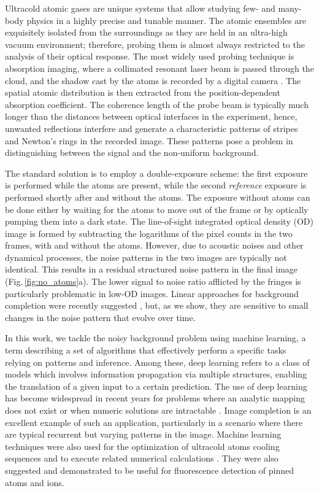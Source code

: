 \documentclass[twocolumn,groupedaddress,longbibliography]{revtex4-1}
\begin{document}
Ultracold atomic gases are unique systems that allow studying few- and many-body physics in a highly precise and tunable manner. The atomic ensembles are exquisitely isolated from the surroundings as they are held in an ultra-high vacuum environment; therefore, probing them is almost always restricted to the analysis of their optical response. The most widely used probing technique is absorption imaging, where a collimated resonant laser beam is passed through the cloud, and the shadow cast by the atoms is recorded by a digital camera \cite{MakingProbing}. The spatial atomic distribution is then extracted from the position-dependent absorption coefficient. The coherence length of the probe beam is typically much longer than the distances between optical interfaces in the experiment, hence, unwanted reflections interfere and generate a characteristic patterns of stripes and Newton's rings in the recorded image. These patterns pose a problem in distinguishing between the signal and the non-uniform background.

The standard solution is to employ a double-exposure scheme: the first exposure is performed while the atoms are present, while the second \emph{reference} exposure is performed shortly after and without the atoms. The exposure without atoms can be done either by waiting for the atoms to move out of the frame or by optically pumping them into a dark state. The line-of-sight integrated optical density (OD) image is formed by subtracting the logarithms of the pixel counts in the two frames, with and without the atoms. However, due to acoustic noises and other dynamical processes, the noise patterns in the two images are typically not identical. This results in a residual structured noise pattern in the final image (Fig.\,\ref{fig:no_atoms}a). The lower signal to noise ratio afflicted by the fringes is particularly problematic in low-OD images. Linear approaches for background completion were recently suggested \cite{Niu2018,Song2020}, but, as we show, they are sensitive to small changes in the noise pattern that evolve over time.

In this work, we tackle the noisy background problem using machine learning, a term describing a set of algorithms that effectively perform a specific tasks relying on patterns and inference. Among these, deep learning refers to a class of models which involves information propagation via multiple structures, enabling the translation of a given input to a certain prediction. The use of deep learning has become widespread in recent years for problems where an analytic mapping does not exist or when numeric solutions are intractable \cite{LeCun2015,Biamonte2017,Mehta2019,Carleo2019,Raghu2020}. Image completion is an excellent example of such an application, particularly in a scenario where there are typical recurrent but varying patterns in the image. Machine learning techniques were also used for the optimization of ultracold atoms cooling sequences \cite{Wigley2016,Tranter2018,Nakamura2019,Barker2019} and to execute related numerical calculations \cite{Pilati2019}. They were also suggested \cite{Picard2019} and demonstrated \cite{Ding2019} to be useful for fluorescence detection of pinned atoms and ions. 
\end{document}
